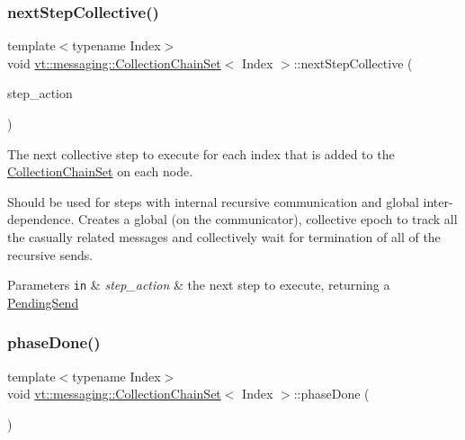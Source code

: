 \subsubsection{\texorpdfstring{next\+Step\+Collective()}{nextStepCollective()}\hspace{0.1cm}{\footnotesize\ttfamily [2/2]}}
{\footnotesize\ttfamily template$<$typename Index$>$ \\
void \hyperlink{classvt_1_1messaging_1_1_collection_chain_set}{vt\+::messaging\+::\+Collection\+Chain\+Set}$<$ Index $>$\+::next\+Step\+Collective (\begin{DoxyParamCaption}\item[{std\+::function$<$ \hyperlink{structvt_1_1messaging_1_1_pending_send}{Pending\+Send}(Index)$>$}]{step\+\_\+action }\end{DoxyParamCaption})\hspace{0.3cm}{\ttfamily [inline]}}



The next collective step to execute for each index that is added to the \hyperlink{classvt_1_1messaging_1_1_collection_chain_set}{Collection\+Chain\+Set} on each node. 

Should be used for steps with internal recursive communication and global inter-\/dependence. Creates a global (on the communicator), collective epoch to track all the casually related messages and collectively wait for termination of all of the recursive sends.


\begin{DoxyParams}[1]{Parameters}
\mbox{\tt in}  & {\em step\+\_\+action} & the next step to execute, returning a {\ttfamily \hyperlink{structvt_1_1messaging_1_1_pending_send}{Pending\+Send}} \\
\hline
\end{DoxyParams}
\mbox{\label{classvt_1_1messaging_1_1_collection_chain_set_afcb749b22063068d060f35fdcd2320b3}} 
\subsubsection{\texorpdfstring{phase\+Done()}{phaseDone()}}
{\footnotesize\ttfamily template$<$typename Index$>$ \\
void \hyperlink{classvt_1_1messaging_1_1_collection_chain_set}{vt\+::messaging\+::\+Collection\+Chain\+Set}$<$ Index $>$\+::phase\+Done (\begin{DoxyParamCaption}{ }\end{DoxyParamCaption})\hspace{0.3cm}{\ttfamily [inline]}}



